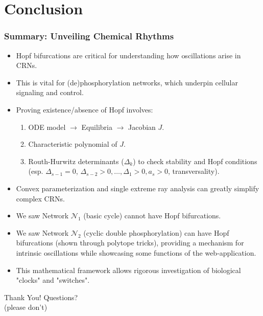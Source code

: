 \documentclass[aspectratio=169]{beamer}
\begin{document}
\section{Conclusion}

\begin{frame}{\insertsectionhead}
	\frametitle{Summary: Unveiling Chemical Rhythms}
	\begin{itemize}
		\item Hopf bifurcations are critical for understanding how \alert{oscillations} arise in CRNs.
		\item This is vital for (de)phosphorylation networks, which underpin cellular signaling and control.
		\item Proving existence/absence of Hopf involves:
			\begin{enumerate}
				\item ODE model $\to$ Equilibria $\to$ Jacobian $J$.
				\item Characteristic polynomial of $J$.
				\item Routh-Hurwitz determinants ($\Delta_k$) to check stability and Hopf conditions (esp. $\Delta_{s-1}=0$, $\Delta_{s-2}>0, \dots, \Delta_1>0, a_s>0$, transversality).
			\end{enumerate}
		\item \alert{Convex parameterization} and \alert{single extreme ray} analysis can greatly simplify complex CRNs.
		\item We saw Network $\mathcal{N}_1$ (basic cycle) \alert{cannot} have Hopf bifurcations.
		\item We saw Network $\mathcal{N}_2$ (cyclic double phosphorylation) \alert{can} have Hopf bifurcations (shown through polytope tricks), providing a mechanism for intrinsic oscillations while showcasing some functions of the web-application.
		\item This mathematical framework allows rigorous investigation of biological "clocks" and "switches".
	\end{itemize}
\end{frame}

\begin{frame}[plain]
	\centering
	\vfill
	\Huge Thank You!
	\vfill
	Questions? \\
	{\small (please don't) }
	\vfill
\end{frame}
\end{document}
